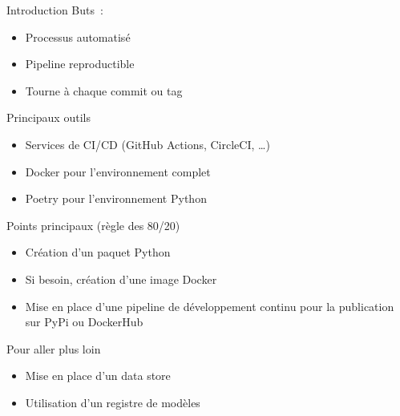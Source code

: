 \begin{frame}{Introduction}
  Buts~:

  \begin{itemize}[<+->]
    \item Processus automatisé
    \item Pipeline reproductible
    \item Tourne à chaque commit ou tag
  \end{itemize}
\end{frame}

\begin{frame}{Principaux outils}
  \begin{itemize}[<+->]
    \item Services de CI/CD (GitHub Actions, CircleCI, …)
    \item Docker pour l'environnement complet
    \item Poetry pour l'environnement Python
  \end{itemize}
\end{frame}

\begin{frame}{Points principaux (règle des 80/20)}
  \begin{itemize}[<+->]
    \item Création d'un paquet Python
    \item Si besoin, création d'une image Docker
    \item Mise en place d'une pipeline de développement continu pour la publication sur
      PyPi ou DockerHub
  \end{itemize}
\end{frame}

\begin{frame}{Pour aller plus loin}
  \begin{itemize}[<+->]
    \item Mise en place d'un data store
    \item Utilisation d'un registre de modèles
  \end{itemize}
\end{frame}

